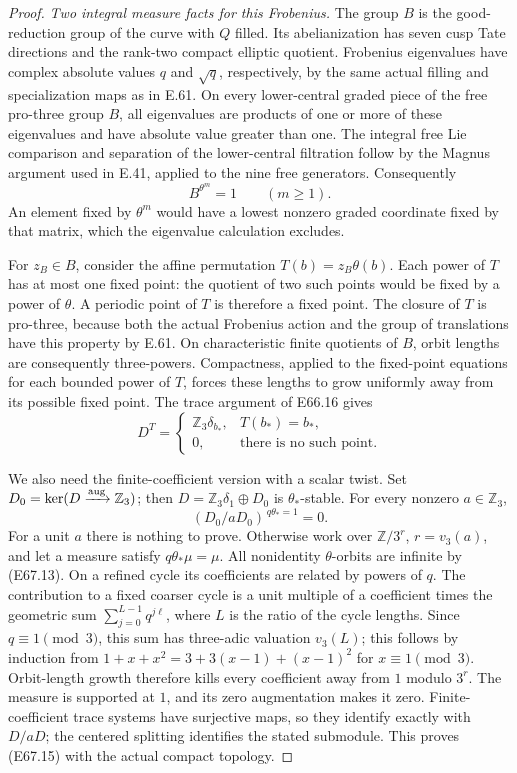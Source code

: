 \begin{proof}
\emph{Two integral measure facts for this Frobenius.}
The group $B$ is the good-reduction group of the curve
with $Q$ filled. Its abelianization has seven cusp Tate
directions and the rank-two compact elliptic quotient.
Frobenius eigenvalues have complex absolute values $q$
and $\sqrt q$, respectively, by the same actual filling
and specialization maps as in E.61. On every lower-central
graded piece of the free pro-three group $B$, all
eigenvalues are products of one or more of these
eigenvalues and have absolute value greater than one.
The integral free Lie comparison and separation of the
lower-central filtration follow by the Magnus argument
used in E.41, applied to the nine free generators.
Consequently
\[
                 B^{\theta^m}=1\qquad(m\ge1).
 \tag{E67.13}
\]
An element fixed by $\theta^m$ would have a lowest
nonzero graded coordinate fixed by that matrix, which
the eigenvalue calculation excludes.

For $z_B\in B$, consider the affine permutation
$T(b)=z_B\theta(b)$. Each power of $T$ has at most
one fixed point: the quotient of two such points would
be fixed by a power of $\theta$. A periodic point of
$T$ is therefore a fixed point. The closure of $T$ is
pro-three, because both the actual Frobenius action and
the group of translations have this property by E.61.
On characteristic finite quotients of $B$, orbit lengths
are consequently three-powers. Compactness, applied to
the fixed-point equations for each bounded power of $T$,
forces these lengths to grow uniformly away from its
possible fixed point. The trace argument of E66.16 gives
\[
 D^T=\begin{cases}
       \mathbb Z_3\delta_{b_*},&T(b_*)=b_*,\\
       0,&\text{there is no such point}.
      \end{cases}
 \tag{E67.14}
\]

We also need the finite-coefficient version with a scalar
twist. Set $D_0=\ker(D\xrightarrow{\rm aug}\mathbb Z_3)$;
then $D=\mathbb Z_3\delta_1\oplus D_0$ is
$\theta_*$-stable. For every nonzero $a\in\mathbb Z_3$,
\[
              (D_0/aD_0)^{\,q\theta_*=1}=0.
 \tag{E67.15}
\]
For a unit $a$ there is nothing to prove. Otherwise work
over $\mathbb Z/3^r$, $r=v_3(a)$, and let a measure
satisfy $q\theta_*\mu=\mu$. All nonidentity
$\theta$-orbits are infinite by (E67.13). On a refined
cycle its coefficients are related by powers of $q$.
The contribution to a fixed coarser cycle is a unit
multiple of a coefficient times the geometric sum
$\sum_{j=0}^{L-1}q^{j\ell}$, where $L$ is the ratio
of the cycle lengths. Since $q\equiv1\pmod3$, this
sum has three-adic valuation $v_3(L)$; this follows
by induction from
$1+x+x^2=3+3(x-1)+(x-1)^2$ for $x\equiv1\pmod3$.
Orbit-length growth therefore kills every coefficient
away from $1$ modulo $3^r$. The measure is supported
at $1$, and its zero augmentation makes it zero.
Finite-coefficient trace systems have surjective maps,
so they identify exactly with $D/aD$; the centered
splitting identifies the stated submodule. This proves
(E67.15) with the actual compact topology.


\end{proof}
